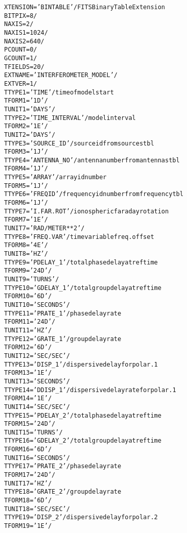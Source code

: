 \documentclass[twoside]{article}
\begin{document}
\begin{alltt}
XTENSION= 'BINTABLE'           / FITS Binary Table Extension
BITPIX  =                    8 /
NAXIS   =                    2 /
NAXIS1  =                 1024 /
NAXIS2  =                  640 /
PCOUNT  =                    0 /
GCOUNT  =                    1 /
TFIELDS =                   20 /
EXTNAME = 'INTERFEROMETER_MODEL' /
EXTVER  =                    1 /
TTYPE1  = 'TIME    '           / time of model start
TFORM1  = '1D      '           /
TUNIT1  = 'DAYS    '           /
TTYPE2  = 'TIME_INTERVAL'      / model interval
TFORM2  = '1E      '           /
TUNIT2  = 'DAYS    '           /
TTYPE3  = 'SOURCE_ID'          / source id from sources tbl
TFORM3  = '1J      '           /
TTYPE4  = 'ANTENNA_NO'         / antenna number from antennas tbl
TFORM4  = '1J      '           /
TTYPE5  = 'ARRAY   '           / array id number
TFORM5  = '1J      '           /
TTYPE6  = 'FREQID  '           / frequency id number from frequency tbl
TFORM6  = '1J      '           /
TTYPE7  = 'I.FAR.ROT'          / ionospheric faraday rotation
TFORM7  = '1E      '           /
TUNIT7  = 'RAD/METER**2'       /
TTYPE8  = 'FREQ.VAR'           / time variable freq. offset
TFORM8  = '4E      '           /
TUNIT8  = 'HZ      '           /
TTYPE9  = 'PDELAY_1'           / total phase delay at ref time
TFORM9  = '24D     '           /
TUNIT9  = 'TURNS   '           /
TTYPE10 = 'GDELAY_1'           / total group delay at ref time
TFORM10 = '6D      '           /
TUNIT10 = 'SECONDS '           /
TTYPE11 = 'PRATE_1 '           / phase delay rate
TFORM11 = '24D     '           /
TUNIT11 = 'HZ      '           /
TTYPE12 = 'GRATE_1 '           / group delay rate
TFORM12 = '6D      '           /
TUNIT12 = 'SEC/SEC '           /
TTYPE13 = 'DISP_1  '           / dispersive delay for polar.1
TFORM13 = '1E      '           /
TUNIT13 = 'SECONDS '           /
TTYPE14 = 'DDISP_1 '           / dispersive delay rate for polar. 1
TFORM14 = '1E      '           /
TUNIT14 = 'SEC/SEC '           /
TTYPE15 = 'PDELAY_2'           / total phase delay at ref time
TFORM15 = '24D     '           /
TUNIT15 = 'TURNS   '           /
TTYPE16 = 'GDELAY_2'           / total group delay at ref time
TFORM16 = '6D      '           /
TUNIT16 = 'SECONDS '           /
TTYPE17 = 'PRATE_2 '           / phase delay rate
TFORM17 = '24D     '           /
TUNIT17 = 'HZ      '           /
TTYPE18 = 'GRATE_2 '           / group delay rate
TFORM18 = '6D      '           /
TUNIT18 = 'SEC/SEC '           /
TTYPE19 = 'DISP_2  '           / dispersive delay for polar.2
TFORM19 = '1E      '           /

\end{alltt}
\end{document}
